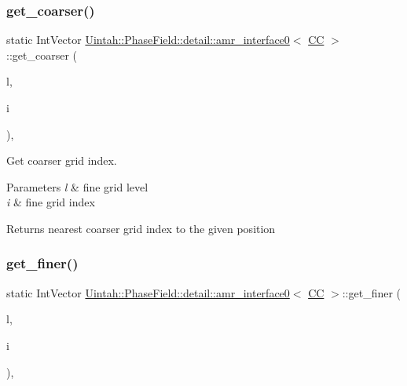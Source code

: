 \subsubsection{\texorpdfstring{get\+\_\+coarser()}{get\_coarser()}}
{\footnotesize\ttfamily static Int\+Vector \hyperlink{classUintah_1_1PhaseField_1_1detail_1_1amr__interface0}{Uintah\+::\+Phase\+Field\+::detail\+::amr\+\_\+interface0}$<$ \hyperlink{namespaceUintah_1_1PhaseField_a33d355affda78a83f45755ba8388cedda22303704507d024d1d6508ed9859a85a}{CC} $>$\+::get\+\_\+coarser (\begin{DoxyParamCaption}\item[{const Level $\ast$}]{l,  }\item[{const Int\+Vector \&}]{i }\end{DoxyParamCaption})\hspace{0.3cm}{\ttfamily [inline]}, {\ttfamily [static]}}



Get coarser grid index. 


\begin{DoxyParams}{Parameters}
{\em l} & fine grid level \\
\hline
{\em i} & fine grid index \\
\hline
\end{DoxyParams}
\begin{DoxyReturn}{Returns}
nearest coarser grid index to the given position 
\end{DoxyReturn}
\mbox{\label{classUintah_1_1PhaseField_1_1detail_1_1amr__interface0_3_01CC_01_4_a04ebe7c5eb56f351c20353fe93a09e3a}} 
\subsubsection{\texorpdfstring{get\+\_\+finer()}{get\_finer()}}
{\footnotesize\ttfamily static Int\+Vector \hyperlink{classUintah_1_1PhaseField_1_1detail_1_1amr__interface0}{Uintah\+::\+Phase\+Field\+::detail\+::amr\+\_\+interface0}$<$ \hyperlink{namespaceUintah_1_1PhaseField_a33d355affda78a83f45755ba8388cedda22303704507d024d1d6508ed9859a85a}{CC} $>$\+::get\+\_\+finer (\begin{DoxyParamCaption}\item[{const Level $\ast$}]{l,  }\item[{const Int\+Vector \&}]{i }\end{DoxyParamCaption})\hspace{0.3cm}{\ttfamily [inline]}, {\ttfamily [static]}}



